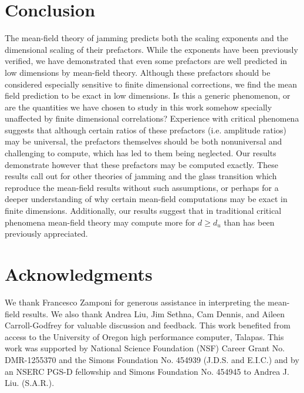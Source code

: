\section{Conclusion}
The mean-field theory of jamming predicts both the scaling exponents and the dimensional scaling of their prefactors. While the exponents have been previously verified, we have demonstrated that even some prefactors are well predicted in low dimensions by mean-field theory. Although these prefactors should be considered especially sensitive to finite dimensional corrections, we find the mean field prediction to be exact in low dimensions. Is this a generic phenomenon, or are the quantities we have chosen to study in this work somehow specially unaffected by finite dimensional correlations? Experience with critical phenomena suggests that although certain ratios of these prefactors (i.e. amplitude ratios) may be universal, the prefactors themselves should be both nonuniversal and challenging to compute, which has led to them being neglected. Our results demonstrate however that these prefactors may be computed exactly. These results call out for other theories of jamming and the glass transition which reproduce the mean-field results without such assumptions, or perhaps for a deeper understanding of why certain mean-field computations may be exact in finite dimensions. Additionally, our results suggest that in traditional critical phenomena mean-field theory may compute more for $d\geq d_u$ than has been previously appreciated.


\section{Acknowledgments}
We thank Francesco Zamponi for generous assistance in interpreting the mean-field results. We also thank Andrea Liu, Jim Sethna, Cam Dennis, and Aileen Carroll-Godfrey for valuable discussion and feedback. This work benefited from access to the University of Oregon high performance computer, Talapas. This work was supported by National Science Foundation (NSF) Career Grant No. DMR-1255370 and the Simons Foundation No. 454939 (J.D.S. and E.I.C.) and by an NSERC PGS-D fellowship and Simons Foundation No. 454945 to Andrea J. Liu. (S.A.R.). 



%
%

